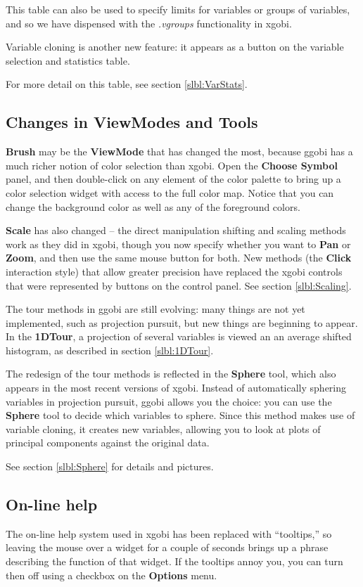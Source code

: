 \documentclass[11pt]{article}
\begin{document}
This table can also be used to specify limits for variables or groups
of variables, and so we have dispensed with the {\em .vgroups}
functionality in xgobi.

Variable cloning is another new feature: it appears as a button
on the variable selection and statistics table.

For more detail on this table, see section \ref{slbl:VarStats}.

\subsection{Changes in ViewModes and Tools}

{\bf Brush} may be the {\bf ViewMode} that has changed the most,
because ggobi has a much richer notion of color selection than
xgobi.  Open the {\bf Choose Symbol} panel, and then double-click on
any element of the color palette to bring up a color selection widget
with access to the full color map.  Notice that you can change the
background color as well as any of the foreground colors.

{\bf Scale} has also changed -- the direct manipulation shifting and
scaling methods work as they did in xgobi, though you now specify
whether you want to {\bf Pan} or {\bf Zoom}, and then use the same
mouse button for both.  New methods (the {\bf Click} interaction
style) that allow greater precision have replaced the xgobi controls
that were represented by buttons on the control panel.  See section
\ref{slbl:Scaling}.

The tour methods in ggobi are still evolving:  many things are not
yet implemented, such as projection pursuit, but new things are
beginning to appear.  In the {\bf 1DTour}, a projection of several
variables is viewed an an average shifted histogram, as described
in section \ref{slbl:1DTour}.

The redesign of the tour methods is reflected in the {\bf Sphere}
tool, which also appears in the most recent versions of xgobi.
Instead of automatically sphering variables in projection pursuit,
ggobi allows you the choice:  you can use the {\bf Sphere} tool to
decide which variables to sphere.  Since this method makes use of
variable cloning, it creates new variables, allowing you to look at
plots of principal components against the original data.

See section \ref{slbl:Sphere} for details and pictures.

\subsection{On-line help}

The on-line help system used in xgobi has been replaced with
``tooltips,'' so leaving the mouse over a widget for a couple of
seconds brings up a phrase describing the function of that widget.
If the tooltips annoy you, you can turn then off using a
checkbox on the {\bf Options} menu.
\end{document}
